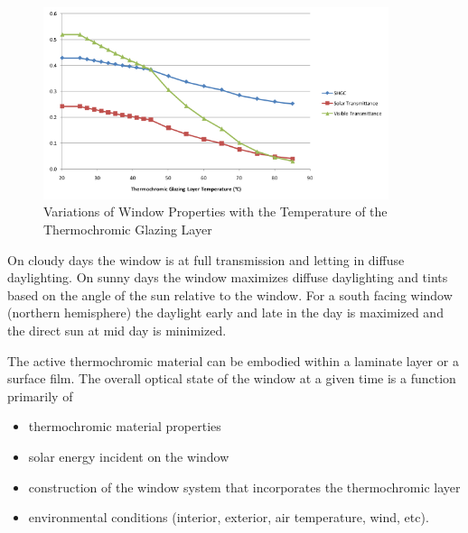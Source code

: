 \begin{figure}[hbtp] %
\centering
\includegraphics[width=0.9\textwidth, height=0.9\textheight, keepaspectratio=true]{media/image1015.svg.png}
\caption{Variations of Window Properties with the Temperature of the Thermochromic Glazing Layer \protect \label{fig:variations-of-window-properties-with}}
\end{figure}

On cloudy days the window is at full transmission and letting in diffuse daylighting. On sunny days the window maximizes diffuse daylighting and tints based on the angle of the sun relative to the window. For a south facing window (northern hemisphere) the daylight early and late in the day is maximized and the direct sun at mid day is minimized.

The active thermochromic material can be embodied within a laminate layer or a surface film. The overall optical state of the window at a given time is a function primarily of

\begin{itemize}
\item
  thermochromic material properties
\item
  solar energy incident on the window
\item
  construction of the window system that incorporates the thermochromic layer
\item
  environmental conditions (interior, exterior, air temperature, wind, etc).
\end{itemize}

